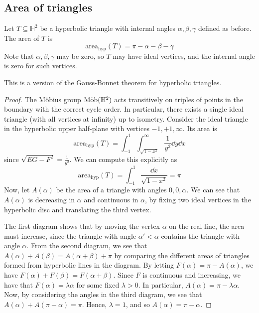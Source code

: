 \subsection{Area of triangles}
\begin{theorem}
	Let \( T \subseteq \mathbb H^2 \) be a hyperbolic triangle with internal angles \( \alpha, \beta, \gamma \) defined as before.
	The area of \( T \) is
	\[
		\mathrm{area}_{\text{hyp}}(T) = \pi - \alpha - \beta - \gamma
	\]
	Note that \( \alpha, \beta, \gamma \) may be zero, so \( T \) may have ideal vertices, and the internal angle is zero for such vertices.
\end{theorem}
This is a version of the Gauss-Bonnet theorem for hyperbolic triangles.
\begin{proof}
	The M\"obius group \( \text{M\"ob}(\mathbb H^2) \) acts transitively on triples of points in the boundary with the correct cycle order.
	In particular, there exists a single ideal triangle (with all vertices at infinity) up to isometry.
	Consider the ideal triangle in the hyperbolic upper half-plane with vertices \( -1, +1, \infty \).
	Its area is
	\[
		\mathrm{area}_{\text{hyp}}(T) = \int_{-1}^1 \int_{\sqrt{1-x^2}}^\infty \frac{1}{y^2} \dd{y} \dd{x}
	\]
	since \( \sqrt{EG - F^2} = \frac{1}{y^2} \).
	We can compute this explicitly as
	\[
		\mathrm{area}_{\text{hyp}}(T) = \int_{-1}^1 \frac{\dd{x}}{\sqrt{1-x^2}} = \pi
	\]
	Now, let \( A(\alpha) \) be the area of a triangle with angles \( 0, 0, \alpha \).
	We can see that \( A(\alpha) \) is decreasing in \( \alpha \) and continuous in \( \alpha \), by fixing two ideal vertices in the hyperbolic disc and translating the third vertex.
	\begin{center}
		\quad
		\quad
	\end{center}
	The first diagram shows that by moving the vertex \( \alpha \) on the real line, the area must increase, since the triangle with angle \( \alpha' < \alpha \) contains the triangle with angle \( \alpha \).
	From the second diagram, we see that \( A(\alpha) + A(\beta) = A(\alpha + \beta) + \pi \) by comparing the different areas of triangles formed from hyperbolic lines in the diagram.
	By letting \( F(\alpha) = \pi - A(\alpha) \), we have \( F(\alpha) + F(\beta) = F(\alpha + \beta) \).
	Since \( F \) is continuous and increasing, we have that \( F(\alpha) = \lambda \alpha \) for some fixed \( \lambda > 0 \).
	In particular, \( A(\alpha) = \pi - \lambda \alpha \).
	Now, by considering the angles in the third diagram, we see that \( A(\alpha) + A(\pi - \alpha) = \pi \).
	Hence, \( \lambda = 1 \), and so \( A(\alpha) = \pi - \alpha \).


\end{proof}
